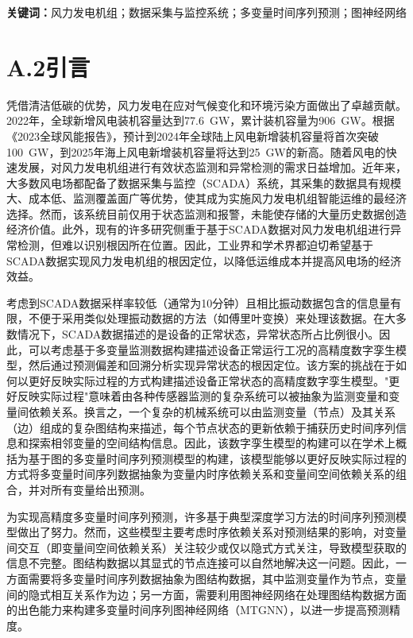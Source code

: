 \textbf{关键词：}风力发电机组；数据采集与监控系统；多变量时间序列预测；图神经网络

\section*{A.2\quad 引言}

凭借清洁低碳的优势，风力发电在应对气候变化和环境污染方面做出了卓越贡献。2022年，全球新增风电装机容量达到77.6~GW，累计装机容量为906~GW。根据《2023全球风能报告》，预计到2024年全球陆上风电新增装机容量将首次突破100~GW，到2025年海上风电新增装机容量将达到25~GW的新高。随着风电的快速发展，对风力发电机组进行有效状态监测和异常检测的需求日益增加。近年来，大多数风电场都配备了数据采集与监控（SCADA）系统，其采集的数据具有规模大、成本低、监测覆盖面广等优势，使其成为实施风力发电机组智能运维的最经济选择。然而，该系统目前仅用于状态监测和报警，未能使存储的大量历史数据创造经济价值。此外，现有的许多研究侧重于基于SCADA数据对风力发电机组进行异常检测，但难以识别根因所在位置。因此，工业界和学术界都迫切希望基于SCADA数据实现风力发电机组的根因定位，以降低运维成本并提高风电场的经济效益。

考虑到SCADA数据采样率较低（通常为10分钟）且相比振动数据包含的信息量有限，不便于采用类似处理振动数据的方法（如傅里叶变换）来处理该数据。在大多数情况下，SCADA数据描述的是设备的正常状态，异常状态所占比例很小。因此，可以考虑基于多变量监测数据构建描述设备正常运行工况的高精度数字孪生模型，然后通过预测偏差和回溯分析实现异常状态的根因定位。该方案的挑战在于如何以更好反映实际过程的方式构建描述设备正常状态的高精度数字孪生模型。"更好反映实际过程"意味着由各种传感器监测的复杂系统可以被抽象为监测变量和变量间依赖关系。换言之，一个复杂的机械系统可以由监测变量（节点）及其关系（边）组成的复杂图结构来描述，每个节点状态的更新依赖于捕获历史时间序列信息和探索相邻变量的空间结构信息。因此，该数字孪生模型的构建可以在学术上概括为基于图的多变量时间序列预测模型的构建，该模型能够以更好反映实际过程的方式将多变量时间序列数据抽象为变量内时序依赖关系和变量间空间依赖关系的组合，并对所有变量给出预测。

为实现高精度多变量时间序列预测，许多基于典型深度学习方法的时间序列预测模型做出了努力。然而，这些模型主要考虑时序依赖关系对预测结果的影响，对变量间交互（即变量间空间依赖关系）关注较少或仅以隐式方式关注，导致模型获取的信息不完整。图结构数据以其显式的节点连接可以自然地解决这一问题。因此，一方面需要将多变量时间序列数据抽象为图结构数据，其中监测变量作为节点，变量间的隐式相互关系作为边；另一方面，需要利用图神经网络在处理图结构数据方面的出色能力来构建多变量时间序列图神经网络（MTGNN），以进一步提高预测精度。

